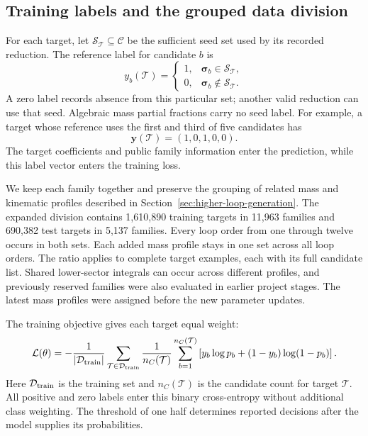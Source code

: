 \subsection{Training labels and the grouped data division}
\label{sec:seed-model-split}
For each target, let $\mathcal S_{\mathcal T}\subseteq\mathcal C$
be the sufficient seed set used by its recorded reduction.
The reference label for candidate $b$ is
\begin{equation}
 y_b(\mathcal T)=
 \begin{cases}
 1,&\boldsymbol\sigma_b\in\mathcal S_{\mathcal T},\\
 0,&\boldsymbol\sigma_b\notin\mathcal S_{\mathcal T}.
 \end{cases}
 \label{eq:seed-membership-label}
\end{equation}
A zero label records absence from this particular set; another valid
reduction can use that seed. Algebraic mass partial fractions carry
no seed label. For example, a target whose reference uses the first
and third of five candidates has
\begin{equation}
 \boldsymbol y(\mathcal T)=(1,0,1,0,0).
 \label{eq:seed-label-example}
\end{equation}
The target coefficients and public family information enter the
prediction, while this label vector enters the training loss.

We keep each family together and preserve the grouping of related
mass and kinematic profiles described in
Section~\ref{sec:higher-loop-generation}. The expanded division
contains 1,610,890 training targets in 11,963
families and 690,382 test targets in 5,137
families. Every loop order from one through twelve occurs in both
sets. Each added mass profile stays in one set across all loop orders.
The ratio applies to complete target examples, each with its full
candidate list. Shared lower-sector integrals can occur across
different profiles, and previously reserved families were also
evaluated in earlier project stages. The latest mass profiles were
assigned before the new parameter updates.

The training objective gives each target equal weight:
\begin{equation}
 \mathcal L(\theta)=
 -\frac{1}{|\mathcal D_{\rm train}|}
 \sum_{\mathcal T\in\mathcal D_{\rm train}}
 \frac{1}{n_C(\mathcal T)}
 \sum_{b=1}^{n_C(\mathcal T)}
 \left[y_b\log p_b+(1-y_b)\log(1-p_b)\right].
 \label{eq:seed-training-loss}
\end{equation}
Here $\mathcal D_{\rm train}$ is the training set and
$n_C(\mathcal T)$ is the candidate count for target $\mathcal T$.
All positive and zero labels enter this binary cross-entropy without
additional class weighting. The threshold of one half determines
reported decisions after the model supplies its probabilities.

